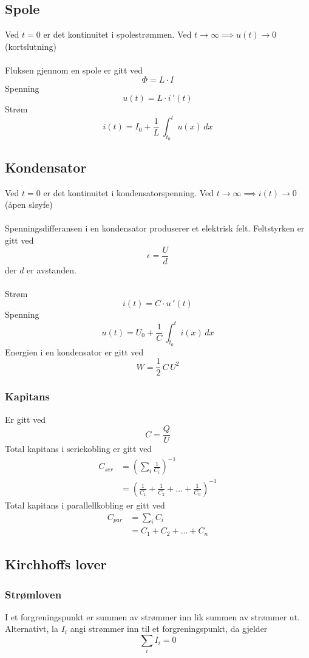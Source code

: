 \documentclass{article}
\begin{document}
\subsection{Spole}
Ved $t = 0$ er det kontinuitet i spolestrømmen. Ved $t \rightarrow \infty \implies u(t) \rightarrow 0$ (kortslutning)\\\\
Fluksen gjennom en spole er gitt ved
\[\Phi = L \cdot I\]
Spenning
\[u(t) = L \cdot i\,'(t)\]
Strøm
\[i(t) = I_0+\frac{1}{L}\,\int_{t_0}^t u(x)\,dx\]

\subsection{Kondensator}
Ved $t = 0$ er det kontinuitet i kondensatorspenning. Ved $t \rightarrow \infty \implies i(t) \rightarrow 0$ (åpen sløyfe)\\\\
Spenningsdifferansen i en kondensator produserer et elektrisk felt.
Feltstyrken er gitt ved
\[\epsilon = \frac{U}{d}\]
der $d$ er avstanden.\\\\
Strøm
\[i(t) = C \cdot u\,'(t)\]
Spenning
\[u(t) = U_0+\frac{1}{C}\,\int_{t_0}^t i(x)\,dx\]
Energien i en kondensator er gitt ved
\[W = \frac{1}{2}\,C\,U^2\]

\subsubsection{Kapitans}
Er gitt ved
\[C = \frac{Q}{U}\]
Total kapitans i seriekobling er gitt ved
\begin{align*}
    C_{ser} &= \left( \sum_i \frac{1}{C_i} \right)^{-1} \\
    &= \left(\frac{1}{C_1} + \frac{1}{C_2} + ... + \frac{1}{C_n}\right)^{-1}
\end{align*}
Total kapitans i parallellkobling er gitt ved
\begin{align*}
    C_{par} &= \sum_i C_i \\
    &= C_1 + C_2 + ... + C_n
\end{align*}

\subsection{Kirchhoffs lover}
\subsubsection{Strømloven}
I et forgreningspunkt er summen av strømmer inn lik summen av strømmer ut. Alternativt, la $I_i$ angi strømmer inn til et forgreningspunkt, da gjelder
\[\sum_i I_i = 0\]
\end{document}
